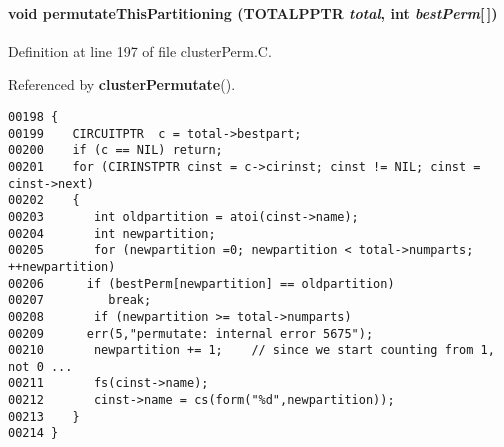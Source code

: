\paragraph{\setlength{\rightskip}{0pt plus 5cm}void permutate\-This\-Partitioning ({\bf TOTALPPTR} {\em total}, int {\em best\-Perm}[$\,$])}\hfill



Definition at line 197 of file cluster\-Perm.C.

Referenced by {\bf cluster\-Permutate}().\small\begin{verbatim}00198 {
00199    CIRCUITPTR  c = total->bestpart;
00200    if (c == NIL) return;
00201    for (CIRINSTPTR cinst = c->cirinst; cinst != NIL; cinst = cinst->next)
00202    {
00203       int oldpartition = atoi(cinst->name);
00204       int newpartition;
00205       for (newpartition =0; newpartition < total->numparts; ++newpartition)
00206      if (bestPerm[newpartition] == oldpartition)
00207         break;
00208       if (newpartition >= total->numparts)
00209      err(5,"permutate: internal error 5675");
00210       newpartition += 1;    // since we start counting from 1, not 0 ...
00211       fs(cinst->name);
00212       cinst->name = cs(form("%d",newpartition));
00213    }
00214 }
\end{verbatim}\normalsize 
